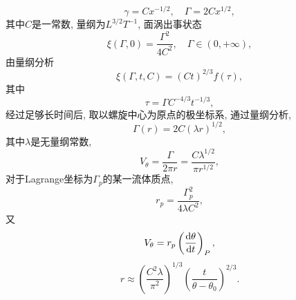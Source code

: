 \documentclass[12pt]{article}
\begin{document}
\begin{equation}
	\gamma = C x^{-1/2}, \quad \Gamma = 2Cx^{1/2},
\end{equation}
其中$C$是一常数, 量纲为$L^{3/2}T^{-1}$, 面涡出事状态
\begin{equation}
	\xi(\Gamma,0) = \frac{\Gamma^2}{4C^2},\quad \Gamma \in (0,+\infty),
\end{equation}
由量纲分析
\begin{equation}
	\xi(\Gamma,t,C) = (Ct)^{2/3}f(\tau),
\end{equation}
其中
\begin{equation}
	\tau = \Gamma C^{-4/3}t^{-1/3},
\end{equation}
经过足够长时间后, 取以螺旋中心为原点的极坐标系, 通过量纲分析, 
\begin{equation}
	\Gamma(r) = 2C(\lambda r)^{1/2},
\end{equation}
其中$\lambda$是无量纲常数, 
\begin{equation}
	V_\theta = \frac{\Gamma}{2\pi r} = \frac{C \lambda^{1/2}}{\pi r^{1/2}},
\end{equation}
对于Lagrange坐标为$\Gamma_p$的某一流体质点, 
\begin{equation}
	r_p = \frac{\Gamma^2_p}{4\lambda C^2},
\end{equation}
又
\begin{equation}
	V_\theta  = r_p \left(\frac{\dif \theta}{\dif t}\right)_P,
\end{equation}
\begin{equation}
	r \approx \left(\frac{C^2\lambda}{\pi^2}\right)^{1/3} \left(\frac{t}{\theta-\theta_0}\right)^{2/3}.
\end{equation}







\nocite{*}


\end{document}
